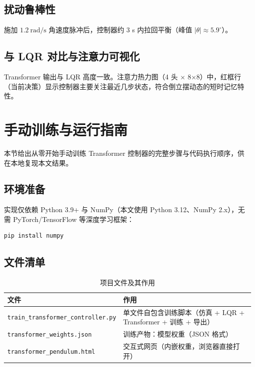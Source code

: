\documentclass[11pt,a4paper]{article}
\begin{document}
\subsection{扰动鲁棒性}

施加 $1.2\ \mathrm{rad/s}$ 角速度脉冲后，控制器约 3 s 内拉回平衡（峰值 $|\theta| \approx 5.9^\circ$）。

\subsection{与 LQR 对比与注意力可视化}

Transformer 输出与 LQR 高度一致。注意力热力图（4 头 × 8×8）中，红框行（当前决策）显示控制器主要关注最近几步状态，符合倒立摆动态的短时记忆特性。

\section{手动训练与运行指南}
\label{sec:run}

本节给出从零开始手动训练 Transformer 控制器的完整步骤与代码执行顺序，供在本地复现本文结果。

\subsection{环境准备}

实现仅依赖 Python 3.9+ 与 NumPy（本文使用 Python 3.12、NumPy 2.x），无需 PyTorch/TensorFlow 等深度学习框架：

\begin{lstlisting}[language=bash]
pip install numpy
\end{lstlisting}

\subsection{文件清单}

\begin{table}[H]
\centering
\caption{项目文件及其作用}
\label{tab:files}
\begin{tabular}{@{}ll@{}}
\toprule
文件 & 作用 \\
\midrule
\texttt{train\_transformer\_controller.py} & 单文件自包含训练脚本（仿真 + LQR + Transformer + 训练 + 导出） \\
\texttt{transformer\_weights.json} & 训练产物：模型权重（JSON 格式） \\
\texttt{transformer\_pendulum.html} & 交互式网页（内嵌权重，浏览器直接打开） \\
\bottomrule
\end{tabular}
\end{table}
\end{document}
